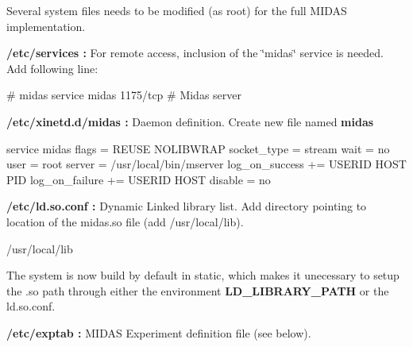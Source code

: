 Several system files needs to be modified (as root) for the full MIDAS implementation.
\begin{DoxyItemize}
\item {\bfseries /etc/services :} For remote access, inclusion of the \char`\"{}midas\char`\"{} service is needed. Add following line: 
\begin{DoxyCode}
  # midas service
  midas           1175/tcp                        # Midas server
\end{DoxyCode}

\item {\bfseries /etc/xinetd.d/midas :} Daemon definition. Create new file named {\bfseries midas} 
\begin{DoxyCode}
  service midas
  {
           flags                   = REUSE NOLIBWRAP
           socket_type             = stream
           wait                    = no
           user                    = root
           server                  = /usr/local/bin/mserver
           log_on_success          += USERID HOST PID
           log_on_failure          += USERID HOST
           disable                 = no
  }
\end{DoxyCode}

\item {\bfseries /etc/ld.so.conf :} Dynamic Linked library list. Add directory pointing to location of the midas.so file (add /usr/local/lib). 
\begin{DoxyCode}
  /usr/local/lib
\end{DoxyCode}
 The system is now build by default in static, which makes it unecessary to setup the .so path through either the environment {\bfseries LD\_\-LIBRARY\_\-PATH} or the ld.so.conf.
\item {\bfseries /etc/exptab :} MIDAS Experiment definition file (see below). \par
\par

\end{DoxyItemize}

